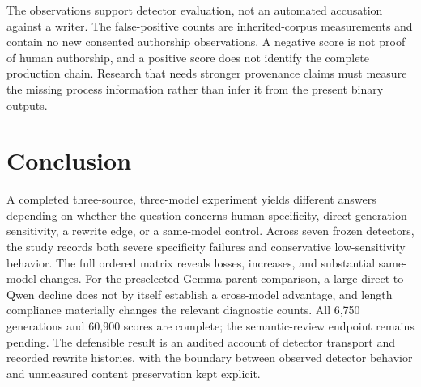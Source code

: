 The observations support detector evaluation, not an automated accusation against a writer. The false-positive counts are inherited-corpus measurements and contain no new consented authorship observations. A negative score is not proof of human authorship, and a positive score does not identify the complete production chain. Research that needs stronger provenance claims must measure the missing process information rather than infer it from the present binary outputs.

\section{Conclusion}
A completed three-source, three-model experiment yields different answers depending on whether the question concerns human specificity, direct-generation sensitivity, a rewrite edge, or a same-model control. Across seven frozen detectors, the study records both severe specificity failures and conservative low-sensitivity behavior. The full ordered matrix reveals losses, increases, and substantial same-model changes. For the preselected Gemma-parent comparison, a large direct-to-Qwen decline does not by itself establish a cross-model advantage, and length compliance materially changes the relevant diagnostic counts. All 6,750 generations and 60,900 scores are complete; the semantic-review endpoint remains pending. The defensible result is an audited account of detector transport and recorded rewrite histories, with the boundary between observed detector behavior and unmeasured content preservation kept explicit.

